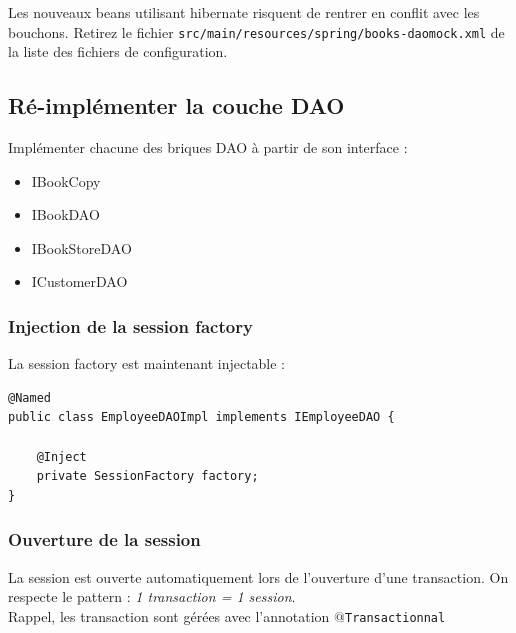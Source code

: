 \documentclass[small,algo]{dushClass}
\begin{document}
Les nouveaux beans utilisant hibernate risquent de rentrer en conflit avec les bouchons. Retirez le fichier \texttt{src/main/resources/spring/books-daomock.xml} de la liste des fichiers de configuration.


\subsection{Ré-implémenter la couche DAO}

Implémenter chacune des briques DAO à partir de son interface :
\begin{itemize}
\item IBookCopy
\item IBookDAO
\item IBookStoreDAO
\item ICustomerDAO
\end{itemize}



\subsubsection{Injection de la session factory}

La session factory est maintenant injectable :
\begin{lstlisting}
@Named
public class EmployeeDAOImpl implements IEmployeeDAO {
	
	@Inject
	private SessionFactory factory;
}
\end{lstlisting}


\subsubsection{Ouverture de la session}
La session est ouverte automatiquement lors de l'ouverture d'une transaction. On respecte le pattern : \emph{1 transaction = 1 session}.\\

Rappel, les transaction sont gérées avec l'annotation \texttt{$@$Transactionnal}




\end{document}
